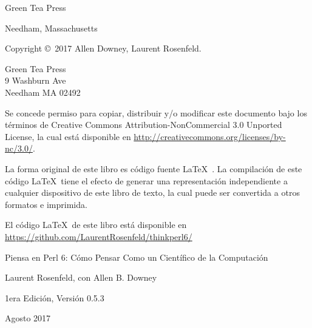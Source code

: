 \documentclass[10pt]{book}
\newcommand{\thetitle}{Piensa en Perl 6: Cómo Pensar Como un Científico de la Computación}
\newcommand{\theversion}{1era Edición, Versión 0.5.3}
\newcommand{\thedate}{Agosto 2017}
\begin{document}
\begin{latexonly}
\begin{flushright}
{\Large Green Tea Press}

{\small Needham, Massachusetts}

\vfill

\end{flushright}


\pagebreak
\thispagestyle{empty}

{\small
Copyright \copyright ~2017 Allen Downey, Laurent Rosenfeld.


\vspace{0.2in}

\begin{flushleft}
Green Tea Press       \\
9 Washburn Ave        \\
Needham MA 02492
\end{flushleft}

Se concede permiso para copiar, distribuir y/o modificar
este documento bajo los términos de Creative Commons Attribution-NonCommercial 3.0 Unported
License, la cual está disponible en \url{http://creativecommons.org/licenses/by-nc/3.0/}.

La forma original de este libro es código fuente \LaTeX\ . La compilación de
este código \LaTeX\ tiene el efecto de generar una representación independiente
a cualquier dispositivo de este libro de texto, la cual puede ser convertida a
otros formatos e imprimida.

El código \LaTeX\ de este libro está disponible en
\url{https://github.com/LaurentRosenfeld/thinkperl6/}

\vspace{0.2in}

} %

\end{latexonly}



\begin{htmlonly}


{\Large \thetitle}

{\large Laurent Rosenfeld,
con Allen B. Downey}

\theversion

\thedate

\setcounter{chapter}{-1}

\end{htmlonly}

\fi
\end{document}
